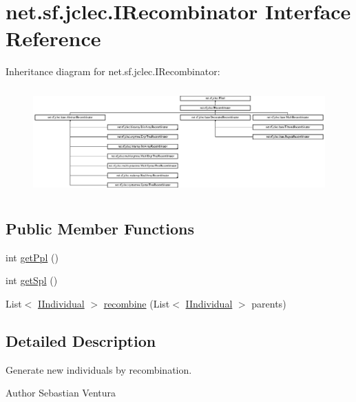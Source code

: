 \hypertarget{interfacenet_1_1sf_1_1jclec_1_1_i_recombinator}{\section{net.\-sf.\-jclec.\-I\-Recombinator Interface Reference}
\label{interfacenet_1_1sf_1_1jclec_1_1_i_recombinator}
}
Inheritance diagram for net.\-sf.\-jclec.\-I\-Recombinator\-:\begin{figure}[H]
\begin{center}
\leavevmode
\includegraphics[height=4.105572cm]{interfacenet_1_1sf_1_1jclec_1_1_i_recombinator}
\end{center}
\end{figure}
\subsection*{Public Member Functions}
\begin{DoxyCompactItemize}
\item 
int \hyperlink{interfacenet_1_1sf_1_1jclec_1_1_i_recombinator_a5e9e851fc35894e4e5a53531616ed42c}{get\-Ppl} ()
\item 
int \hyperlink{interfacenet_1_1sf_1_1jclec_1_1_i_recombinator_a398927d69f307ecf449ac93c9e025933}{get\-Spl} ()
\item 
List$<$ \hyperlink{interfacenet_1_1sf_1_1jclec_1_1_i_individual}{I\-Individual} $>$ \hyperlink{interfacenet_1_1sf_1_1jclec_1_1_i_recombinator_a07721bb7be250aeae6a85e81c527e7a5}{recombine} (List$<$ \hyperlink{interfacenet_1_1sf_1_1jclec_1_1_i_individual}{I\-Individual} $>$ parents)
\end{DoxyCompactItemize}


\subsection{Detailed Description}
Generate new individuals by recombination.

\begin{DoxyAuthor}{Author}
Sebastian Ventura 
\end{DoxyAuthor}


